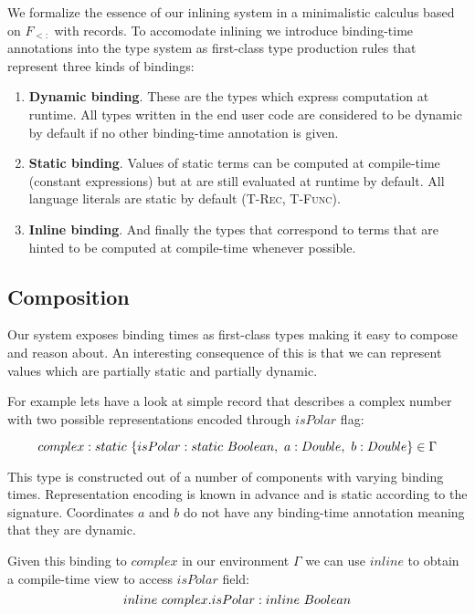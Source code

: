 We formalize the essence of our inlining system in a minimalistic calculus based 
on $F_{<:}$ with records. To accomodate inlining we introduce binding-time annotations 
into the type system as first-class type production rules that represent three kinds 
of bindings:

\begin{enumerate}
  \item \textbf{Dynamic binding}. These are the types which express computation at runtime.
        All types written in the end user code are considered to be dynamic by default if
        no other binding-time annotation is given.

  \item \textbf{Static binding}. Values of static terms can be computed at compile-time
        (\eg constant expressions) but at are still evaluated at runtime by default.
        All language literals are static by default (\textsc{T-Rec}, \textsc{T-Func}).

  \item \textbf{Inline binding}. And finally the types that correspond to terms that
        are hinted to be computed at compile-time whenever possible. 
\end{enumerate}

\subsection{Composition}

Our system exposes binding times as first-class types making it easy to compose and reason about.
An interesting consequence of this is that we can represent values which are partially static
and partially dynamic.

For example lets have a look at simple record that describes a complex number with
two possible representations encoded through $isPolar$ flag:

\begin{equation}\nonumber
    complex: static\ \{ isPolar: static\ Boolean,\ a: Double,\ b: Double \} \in \Gamma
\end{equation}

This type is constructed out of a number of components with varying binding times.
Representation encoding is known in advance and is static according to the signature.  
Coordinates $a$ and $b$ do not have any binding-time annotation meaning that they are 
dynamic.

Given this binding to $complex$ in our environment $\Gamma$ we can use $inline$ to obtain
a compile-time view to access $isPolar$ field:
\begin{equation}\nonumber
  inline\ complex.isPolar: inline\ Boolean
\end{equation}

